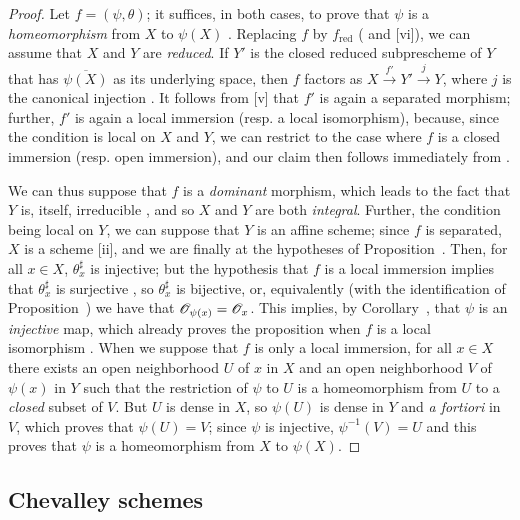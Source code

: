 \begin{proof}
\label{proof-1.8.2.8}
Let $f=(\psi,\theta)$;
it suffices, in both cases, to prove that $\psi$ is a \emph{homeomorphism} from $X$ to $\psi(X)$ .
Replacing $f$ by $f_\text{red}$ ( and [vi]), we can assume that $X$ and $Y$ are \emph{reduced}.
If $Y'$ is the closed reduced subprescheme of $Y$ that has $\overline{\psi(X)}$ as its underlying space, then $f$ factors as $X\xrightarrow{f'}Y'\xrightarrow{j}Y$, where $j$ is the canonical injection .
It follows from [v] that $f'$ is again a separated morphism; further, $f'$ is again
a local immersion (resp. a local isomorphism), because, since the condition is local on $X$ and $Y$, we can restrict to the case where $f$ is a closed immersion (resp. open immersion), and our claim then follows immediately from .

We can thus suppose that $f$ is a \emph{dominant} morphism, which leads to the fact that $Y$ is, itself, irreducible , and so $X$ and $Y$ are both \emph{integral}.
Further, the condition being local on $Y$, we can suppose that $Y$ is an affine scheme;
since $f$ is separated, $X$ is a scheme [ii], and we are finally at the hypotheses of Proposition~.
Then, for all $x\in X$, $\theta_x^\sharp$ is injective;
but the hypothesis that $f$ is a local immersion implies that $\theta_x^\sharp$ is surjective , so $\theta_x^\sharp$ is bijective, or, equivalently (with the identification of Proposition~) we have that $\mathscr{O}_{\psi(x)}=\mathscr{O}_x$.
This implies, by Corollary~, that $\psi$ is an \emph{injective} map, which already proves the proposition when $f$ is a local isomorphism .
When we suppose that $f$ is only a local immersion, for all $x\in X$ there exists an open neighborhood $U$ of $x$ in $X$ and an open neighborhood $V$ of $\psi(x)$ in $Y$ such that the restriction of $\psi$ to $U$ is a homeomorphism from $U$ to a \emph{closed} subset of $V$.
But $U$ is dense in $X$, so $\psi(U)$ is dense in $Y$ and \emph{a fortiori} in $V$, which proves that $\psi(U)=V$;
since $\psi$ is injective, $\psi^{-1}(V)=U$ and this proves that $\psi$ is a homeomorphism from $X$ to $\psi(X)$.
\end{proof}

\subsection{Chevalley schemes}
\label{subsection:chevalley-schemes}

